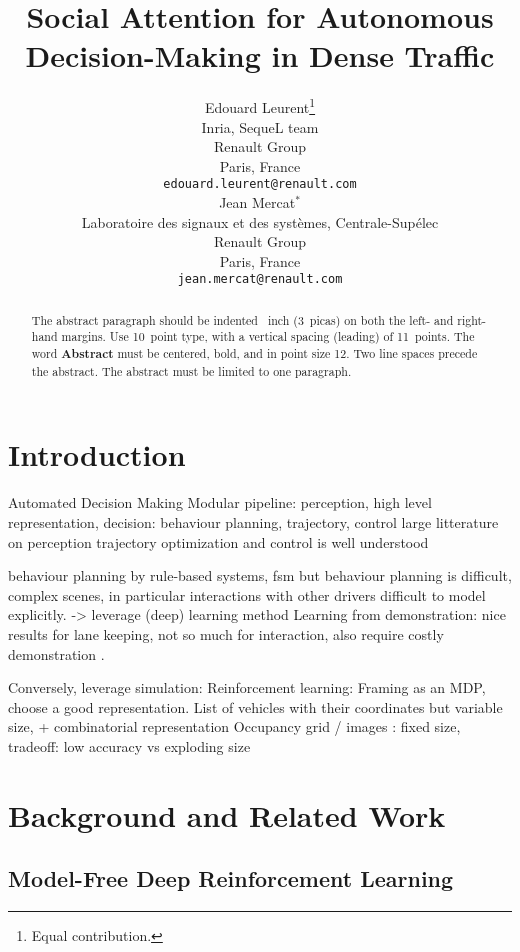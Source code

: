 \documentclass{article}
\title{Social Attention for Autonomous Decision-Making in Dense Traffic}
\author{%
  Edouard Leurent\thanks{Equal contribution.} \\
  Inria, SequeL team\\
  Renault Group\\
  Paris, France\\
  \texttt{edouard.leurent@renault.com} \\
   \And
  Jean Mercat$^*$ \\
  Laboratoire des signaux et des syst\`emes,
  Centrale-Sup\'elec\\
  Renault Group\\
  Paris, France\\
  \texttt{jean.mercat@renault.com} \\
}
\begin{document}
	
	
	
	

\maketitle

\begin{abstract}
  The abstract paragraph should be indented ~inch (3~picas) on
  both the left- and right-hand margins. Use 10~point type, with a vertical
  spacing (leading) of 11~points.  The word \textbf{Abstract} must be centered,
  bold, and in point size 12. Two line spaces precede the abstract. The abstract
  must be limited to one paragraph.
\end{abstract}

\section{Introduction}

Automated Decision Making
Modular pipeline: perception, high level representation, decision: behaviour planning, trajectory, control
large litterature on perception
trajectory optimization and control is well understood

behaviour planning by rule-based systems, fsm
but behaviour planning is difficult, complex scenes, in particular interactions with other drivers difficult to model explicitly.
 -> leverage (deep) learning method
Learning from demonstration: nice results for lane keeping, not so much for interaction, also require costly demonstration . 

Conversely, leverage simulation:
Reinforcement learning:
Framing as an MDP, choose a good representation.
List of vehicles with their coordinates 
but variable size, + combinatorial representation
Occupancy grid / images : fixed size, tradeoff:  low accuracy vs exploding size

\section{Background and Related Work}

\subsection{Model-Free Deep Reinforcement Learning}
\end{document}
